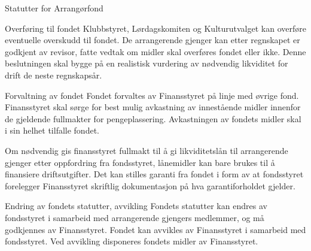 \begin{fond}{Statutter for Arrangørfond}
  \begin{fondsparagraf}{Overføring til fondet}
Klubbstyret, Lørdagskomiten og Kulturutvalget kan overføre eventuelle overskudd til fondet. De arrangerende gjenger
kan etter regnskapet er godkjent av revisor, fatte vedtak om midler skal overføres fondet eller ikke. Denne
beslutningen skal bygge på en realistisk vurdering av nødvendig likviditet for drift de neste regnskapsår.
  \end{fondsparagraf}
  
  \begin{fondsparagraf}{Forvaltning av fondet}
Fondet forvaltes av Finansstyret på linje med øvrige fond. Finansstyret skal sørge for best mulig avkastning av
innestående midler innenfor de gjeldende fullmakter for pengeplassering. Avkastningen av fondets midler skal i sin
helhet tilfalle fondet.

Om nødvendig gis finansstyret fullmakt til å gi likviditetslån til arrangerende gjenger etter oppfordring fra fondsstyret,
lånemidler kan bare brukes til å finansiere driftsutgifter. Det kan stilles garanti fra fondet i form av at fondsstyret
forelegger Finansstyret skriftlig dokumentasjon på hva garantiforholdet gjelder.
  \end{fondsparagraf}
  
  \begin{fondsparagraf}{Endring av fondets statutter, avvikling}
Fondets statutter kan endres av fondsstyret i samarbeid med arrangerende gjengers medlemmer, og må godkjennes av
Finansstyret. Fondet kan avvikles av Finansstyret i samarbeid med fondsstyret. Ved avvikling disponeres fondets
midler av Finansstyret.
  \end{fondsparagraf}

\end{fond}

